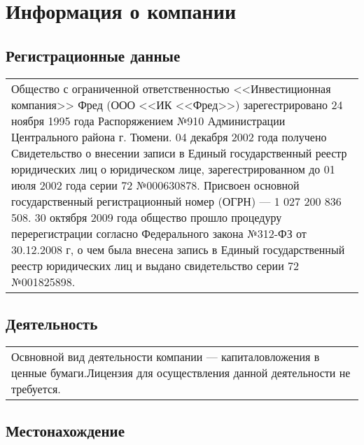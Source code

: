 \documentclass[a4paper,12pt]{scrreprt}
\begin{document}
\tableofcontents

\selectfont

\chapter{Информация о компании}



\section{Регистрационные данные }

\begin{tabular}{|p{}} 
Общество с ограниченной ответственностью <<Инвестиционная компания>> Фред (ООО <<ИК <<Фред>>) зарегестрировано 24 ноября 1995
года Распоряжением №910 Администрации Центрального района г. Тюмени. 04 декабря 2002 года получено Свидетельство о внесении записи
в Единый государственный реестр юридических лиц о юридическом лице, зарегестрированном до 01 июля 2002 года серии 72 №000630878.
Присвоен основной государственный регистрационный номер (ОГРН) --- 1 027 200 836 508. 30 октября 2009 года общество прошло процедуру 
перерегистрации согласно Федерального закона №312-ФЗ от 30.12.2008 г, о чем была внесена запись в Единый государственный реестр юридических
лиц и выдано свидетельство серии 72 №001825898.
\end{tabular}


\section{Деятельность}
\begin{tabular}{|p{}} 
Освновной вид деятельности компании --- капиталовложения в ценные бумаги.Лицензия для осуществления данной деятельности не требуется.
\end{tabular}


\section{Местонахождение}
\end{document}
